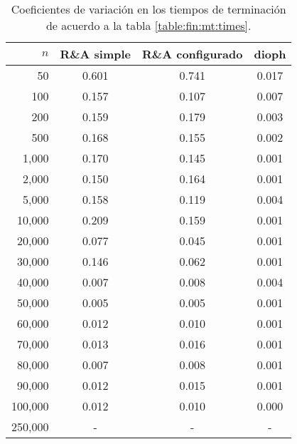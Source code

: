\begin{table}
	\centering
	\begin{tabular}{rccc} \toprule
		$n$ & R\&A simple & R\&A configurado & dioph \\ \midrule
		50       & 0.601 & 0.741 & 0.017 \\
		100      & 0.157 & 0.107 & 0.007 \\
		200      & 0.159 & 0.179 & 0.003 \\
		500      & 0.168 & 0.155 & 0.002 \\ \midrule
		1,000     & 0.170 & 0.145 & 0.001 \\
		2,000     & 0.150 & 0.164 & 0.001 \\
		5,000     & 0.158 & 0.119 & 0.004 \\
		10,000    & 0.209 & 0.159 & 0.001 \\ \midrule
		20,000    & 0.077 & 0.045 & 0.001 \\
		30,000    & 0.146 & 0.062 & 0.001 \\
		40,000    & 0.007 & 0.008 & 0.004 \\
		50,000    & 0.005 & 0.005 & 0.001 \\ \midrule
		60,000    & 0.012 & 0.010 & 0.001 \\
		70,000    & 0.013 & 0.016 & 0.001 \\
		80,000    & 0.007 & 0.008 & 0.001 \\
		90,000    & 0.012 & 0.015 & 0.001 \\ \midrule
		100,000   & 0.012 & 0.010 & 0.000 \\
		250,000 & - & - & - \\ \bottomrule
	\end{tabular}
	\caption{Coeficientes de variación en los tiempos de terminación de acuerdo a la tabla
	\ref{table:fin:mt:times}.}
	\label{table:fin:mt:cv}
\end{table}
